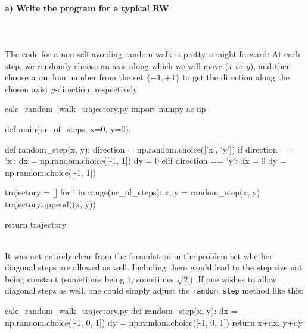 \paragraph{a) Write the program for a typical RW} \ \\
\\
    The code for a non-self-avoiding random walk is pretty 
    straight-forward: At each step, we randomly choose an axis along
    which we will move ($x$ or $y$), and then choose a random 
    number from the set $\{-1, +1\}$ to get the direction along the 
    chosen axis:
    $y$-direction, respectively. \\
    \begin{code}{calc\_random\_walk\_trajectory.py}
        import numpy as np
        
        
        def main(nr_of_steps, x=0, y=0):
        
            def random_step(x, y):
                direction = np.random.choice(['x', 'y'])
                if direction == 'x':
                    dx = np.random.choice([-1, 1])
                    dy = 0
                elif direction == 'y':
                    dx = 0
                    dy = np.random.choice([-1, 1])
        
            trajectory = []
            for i in range(nr_of_steps):
                x, y = random_step(x, y) 
                trajectory.append((x, y))
        
            return trajectory\end{code} \ \\
    \noindent
    It was not entirely clear from the formulation in the problem set 
    whether diagonal steps are allowed as well. 
    Including them would lead to the step size not being constant 
    (sometimes being $1$, sometimes $\sqrt{2}$). If one wishes to 
    allow diagonal steps as well, one could simply adjust the 
    \lstinline{random_step} method like this: \\
    \begin{code}{calc\_random\_walk\_trajectory.py}
        def random_step(x, y):
            dx = np.random.choice([-1, 0, 1])
            dy = np.random.choice([-1, 0, 1])
            return x+dx, y+dy
    \end{code}

\newpage
